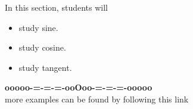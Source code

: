 \documentclass{ximera}
\begin{document}
\begin{sectionOutcomes}
In this section, students will 

\begin{itemize}
\item study sine.
\item study cosine.
\item study tangent.
\end{itemize}
\end{sectionOutcomes}

















\begin{center}
\textbf{\textcolor{green!50!black}{ooooo-=-=-=-ooOoo-=-=-=-ooooo}} \\

more examples can be found by following this link\\ 

\end{center}
\end{document}
